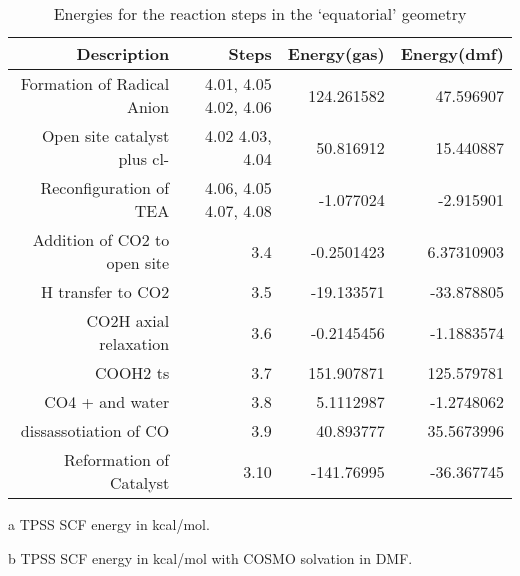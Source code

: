 \begin{table}[!htb]
\centering
 \begin{threeparttable}
  \caption{Energies for the reaction steps in the `equatorial' geometry}
    \begin{tabular}{rrrr}
    \toprule
    Description & Steps & Energy(gas)\tnote{a} & Energy(dmf)\tnote{b} \\
    \midrule
    Formation of Radical Anion & 4.01, 4.05 \ce{->} 4.02, 4.06   & 124.261582 & 47.596907 \\
    Open site catalyst plus cl- & 4.02 \ce{->} 4.03, 4.04 & 50.816912 & 15.440887 \\
    Reconfiguration of TEA & 4.06, 4.05 \ce{->} 4.07, 4.08 & -1.077024 & -2.915901 \\
    \midrule
    Addition of CO2 to open site & 3.4   & -0.2501423 & 6.37310903 \\
    H transfer to CO2 & 3.5   & -19.133571 & -33.878805 \\
    CO2H axial relaxation & 3.6   & -0.2145456 & -1.1883574 \\
    COOH2 ts & 3.7   & 151.907871 & 125.579781 \\
    CO4 + and water & 3.8   & 5.1112987 & -1.2748062 \\
    dissassotiation of CO & 3.9   & 40.893777 & 35.5673996 \\
    Reformation of Catalyst & 3.10  & -141.76995 & -36.367745 \\
    \bottomrule
    \end{tabular}%
    \begin{tablenotes}
    \item [a] TPSS SCF energy in kcal/mol.
    \item [b] TPSS SCF energy in kcal/mol with COSMO solvation in DMF.
    \end{tablenotes}
  \label{tab.siderxn}%
 \end{threeparttable}
\end{table}%


